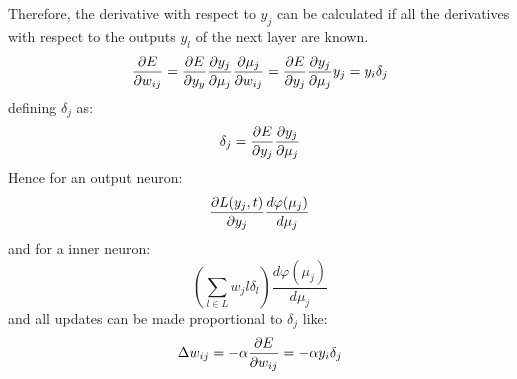 %
Therefore, the derivative with respect to $y_j$ can be calculated if all the derivatives with respect to the outputs $y_l$ of the next layer are known.
\begin{equation}
    \pdv{E}{w_{ij}} = \pdv{E}{y_y} \pdv{y_j}{\mu_j} \pdv{\mu_j}{w_{ij}} = \pdv{E}{y_j} \pdv{y_j}{\mu_j} y_j = y_i \delta_j
\end{equation}
defining $\delta_j$ as:
\begin{equation}
    \delta_j = \pdv{E}{y_j} \pdv{y_j}{\mu_j}
\end{equation}
%
Hence for an output neuron:
\begin{equation}
    \pdv{L(y_j,t)}{y_j} \frac{d\varphi(\mu_j)}{d \mu_j}
\end{equation}
%
and for a inner neuron:
\begin{equation}
    \left( \sum_{l \in L}w_jl \delta_l \right)  \frac{d\varphi(\mu_j)}{d \mu_j}
\end{equation}
%
and all updates can be made proportional to $\delta_j$ like:
\begin{equation}
    \Delta w_{ij} = -\alpha \pdv{E}{w_{ij}} = -\alpha y_i \delta_j
\end{equation}


